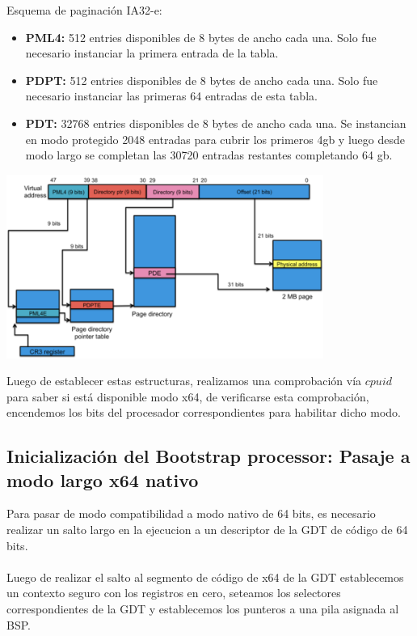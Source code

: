     Esquema de paginación IA32-e:
    \begin{itemize}

        \item \textbf{PML4: } 512 entries disponibles de 8 bytes de ancho cada una. Solo fue necesario instanciar la primera entrada de la tabla.

        \item \textbf{PDPT: } 512 entries disponibles de 8 bytes de ancho cada una. 
        Solo fue necesario instanciar las primeras 64 entradas de esta tabla.

        \item \textbf{PDT: } 32768 entries disponibles de 8 bytes de ancho cada una.
        Se instancian en modo protegido 2048 entradas para cubrir los primeros 4gb y luego desde modo largo se completan las 30720 entradas restantes completando 64 gb.
    \end{itemize}

    \begin{center}
        \includegraphics[height=6cm]{images/ia32e-overview-paging.png}
    \end{center}

	Luego de establecer estas estructuras, realizamos una comprobación vía $cpuid$ para saber si está disponible modo x64, de verificarse esta comprobación, encendemos los bits del procesador correspondientes para habilitar dicho modo.

    \subsection{Inicialización del Bootstrap processor: Pasaje a modo largo x64 nativo}

    Para pasar de modo compatibilidad a modo nativo de 64 bits, es necesario realizar un salto largo en la ejecucion a un descriptor de la GDT de código de 64 bits.\\
    \\
    Luego de realizar el salto al segmento de código de x64 de la GDT establecemos un contexto seguro con los registros en cero, seteamos los selectores correspondientes de la GDT y establecemos los punteros a una pila asignada al BSP.

